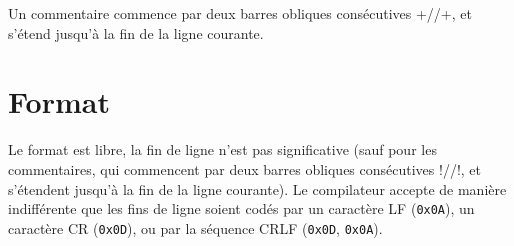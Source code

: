 Un commentaire commence par deux barres obliques consécutives \plm+//+, et s’étend jusqu’à la fin de la ligne courante.




\section{Format}

Le format est libre, la fin de ligne n’est pas significative (sauf pour les commentaires, qui commencent par deux barres obliques consécutives \plm!//!, et s’étendent jusqu’à la fin de la ligne courante). Le compilateur accepte de manière indifférente que les fins de ligne soient codés par un caractère LF (\texttt{0x0A}), un caractère CR (\texttt{0x0D}), ou par la séquence CRLF (\texttt{0x0D}, \texttt{0x0A}).

